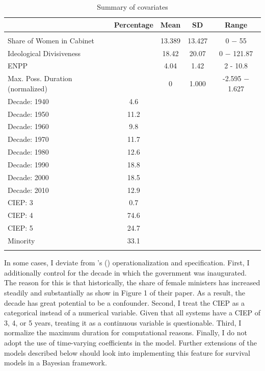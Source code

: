 \documentclass[11pt]{article}
\newcommand\possecite[1]{\citeauthor{#1}'s (\citeyear{#1})}
\begin{document}
\begin{table}[!htbp] \centering 
  \caption{Summary of covariates} 
  \label{tab:summarystat} 
\begin{tabular}{@{\extracolsep{5pt}}lcccc} 
& \multicolumn{1}{c}{\textbf{Percentage}} & \multicolumn{1}{c}{\textbf{Mean}} & \multicolumn{1}{c}{\textbf{SD}} & \multicolumn{1}{c}{\textbf{Range}}
\\\hline 
\hline \\[-1.8ex]  
Share of Women in Cabinet & & 13.389 & 13.427 & 0 $-$ 55\\ 
Ideological Divisiveness & & 18.42 & 20.07 & 0 $-$ 121.87  \\ 
ENPP & & 4.04 & 1.42 & 2 - 10.8\\ 
Max. Poss. Duration (normalized) & & 0 & 1.000 & -2.595 $-$ 1.627 \\\hline 
Decade: 1940 & 4.6 & & & \\ 
Decade: 1950 & 11.2  & & & \\ 
Decade: 1960 & 9.8 & & &   \\ 
Decade: 1970 & 11.7 & & &   \\ 
Decade: 1980 & 12.6 & & &   \\ 
Decade: 1990 & 18.8 & & &   \\ 
Decade: 2000 & 18.5 & & &   \\ 
Decade: 2010 & 12.9 & & &   \\ 
CIEP: 3      & 0.7 & & & \\ 
CIEP: 4      & 74.6 & & & \\ 
CIEP: 5      & 24.7 & & &  \\ 
Minority     & 33.1 & & & \\ 
\hline \\[-1.8ex] 
\end{tabular}  
\end{table} 

In some cases, I deviate from \possecite{KK20} operationalization and specification. First, I additionally control for the decade in which the government was inaugurated. The reason for this is that historically, the share of female ministers has increased steadily and substantially as \textcite{KK20} show in Figure 1 of their paper. As a result, the decade has great potential to be a confounder. Second, I treat the CIEP as a categorical instead of a numerical variable. Given that all systems have a CIEP of 3, 4, or 5 years, treating it as a continuous variable is questionable. Third, I normalize the maximum duration for computational reasons. Finally, I do not adopt the use of time-varying coefficients in the model. Further extensions of the models described below should look into implementing this feature for survival models in a Bayesian framework. 
\end{document}
